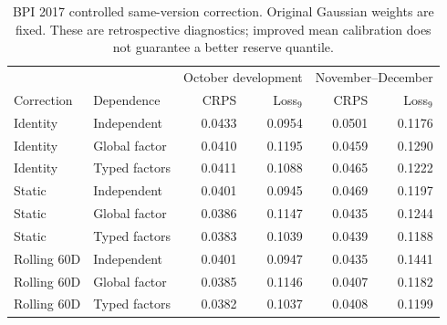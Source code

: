 \begin{table}[t]\centering\small
\caption{BPI 2017 controlled same-version correction. Original Gaussian weights are fixed. These are retrospective diagnostics; improved mean calibration does not guarantee a better reserve quantile.}\label{tab:calibration}
\begin{tabular}{llrr rr}\toprule
& &\multicolumn{2}{c}{October development}&\multicolumn{2}{c}{November--December}\\
Correction&Dependence&CRPS&Loss$_9$&CRPS&Loss$_9$\\\midrule
Identity&Independent&0.0433&0.0954&0.0501&0.1176\\
Identity&Global factor&0.0410&0.1195&0.0459&0.1290\\
Identity&Typed factors&0.0411&0.1088&0.0465&0.1222\\
Static&Independent&0.0401&0.0945&0.0469&0.1197\\
Static&Global factor&0.0386&0.1147&0.0435&0.1244\\
Static&Typed factors&0.0383&0.1039&0.0439&0.1188\\
Rolling 60D&Independent&0.0401&0.0947&0.0435&0.1441\\
Rolling 60D&Global factor&0.0385&0.1146&0.0407&0.1182\\
Rolling 60D&Typed factors&0.0382&0.1037&0.0408&0.1199\\
\bottomrule\end{tabular}\end{table}
